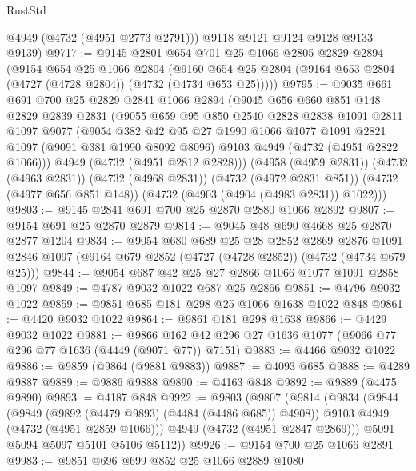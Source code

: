 \begin{lexlean}{RustStd}
\begin{coremodule}
{\begin{coremodule}
{{{{{{{{{{{{{{        @4949
        (@4732 (@4951 @2773 @2791)))
      @9118
      @9121
      @9124
      @9128
      @9133
      @9139)
@9717 := @9145
    @2801
    @654
    @701
    @25
    @1066
    @2805
    @2829
    @2894
    (@9154
      @654
      @25
      @1066
      @2804
      (@9160 @654 @25 @2804 (@9164 @653 @2804 (@4727 (@4728 @2804)) (@4732 (@4734 @653 @25)))))
@9795 := @9035
    @661
    @691
    @700
    @25
    @2829
    @2841
    @1066
    @2894
    (@9045
      @656
      @660
      @851
      @148
      @2829
      @2839
      @2831
      (@9055
        @659
        @95
        @850
        @2540
        @2828
        @2838
        @1091
        @2811
        @1097
        @9077
        (@9054
          @382
          @42
          @95
          @27
          @1990
          @1066
          @1077
          @1091
          @2821
          @1097
          (@9091 @381 @1990 @8092 @8096)
          @9103
          @4949
          (@4732 (@4951 @2822 @1066)))
        @4949
        (@4732 (@4951 @2812 @2828)))
      (@4958 (@4959 @2831))
      (@4732 (@4963 @2831))
      (@4732 (@4968 @2831))
      (@4732 (@4972 @2831 @851))
      (@4732 (@4977 @656 @851 @148))
      (@4732 (@4903 (@4904 (@4983 @2831)) @1022)))
@9803 := @9145 @2841 @691 @700 @25 @2870 @2880 @1066 @2892
@9807 := @9154 @691 @25 @2870 @2879
@9814 := @9045 @48 @690 @4668 @25 @2870 @2877 @1204
@9834 := @9054
    @680
    @689
    @25
    @28
    @2852
    @2869
    @2876
    @1091
    @2846
    @1097
    (@9164 @679 @2852 (@4727 (@4728 @2852)) (@4732 (@4734 @679 @25)))
@9844 := @9054 @687 @42 @25 @27 @2866 @1066 @1077 @1091 @2858 @1097
@9849 := @4787 @9032 @1022 @687 @25 @2866
@9851 := @4796 @9032 @1022
@9859 := @9851 @685 @181 @298 @25 @1066 @1638 @1022 @848
@9861 := @4420 @9032 @1022
@9864 := @9861 @181 @298 @1638
@9866 := @4429 @9032 @1022
@9881 := @9866 @162 @42 @296 @27 @1636 @1077 (@9066 @77 @296 @77 @1636 (@4449 (@9071 @77)) @7151)
@9883 := @4466 @9032 @1022
@9886 := @9859 (@9864 (@9881 @9883))
@9887 := @4093 @685
@9888 := @4289 @9887
@9889 := @9886 @9888
@9890 := @4163 @848
@9892 := @9889 (@4475 @9890)
@9893 := @4187 @848
@9922 := @9803
    (@9807
      (@9814
        (@9834
          (@9844
            (@9849 (@9892 (@4479 @9893) (@4484 (@4486 @685)) @4908))
            @9103
            @4949
            (@4732 (@4951 @2859 @1066)))
          @4949
          (@4732 (@4951 @2847 @2869)))
        @5091
        @5094
        @5097
        @5101
        @5106
        @5112))
@9926 := @9154 @700 @25 @1066 @2891
@9983 := @9851
    @696
    @699
    @852
    @25
    @1066
    @2889
    @1080
}}}}}}}}}}}}}}
\end{coremodule}}
\end{coremodule}
\end{lexlean}
